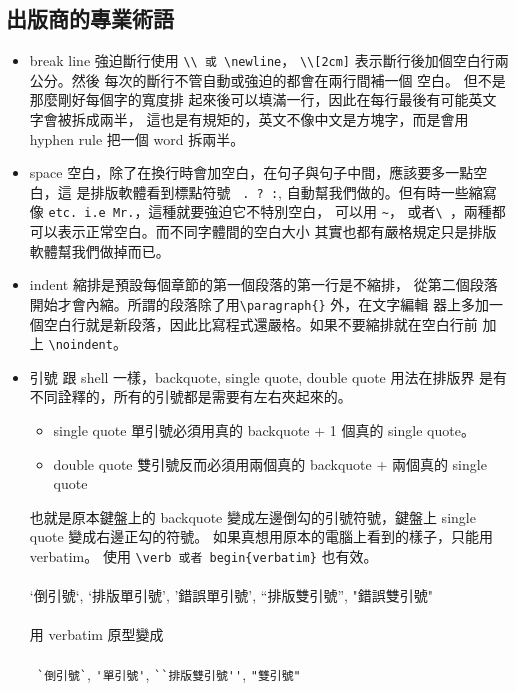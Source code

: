\subsection{出版商的專業術語}
\begin{itemize}
\item break line 強迫斷行使用 \verb=\\ 或 \newline=， \verb=\\[2cm]=
表示斷行後加個空白行兩公分。然後 每次的斷行不管自動或強迫的都會在兩行間補一個
空白。 但不是那麼剛好每個字的寬度排
起來後可以填滿一行，因此在每行最後有可能英文字會被拆成兩半，
這也是有規矩的，英文不像中文是方塊字，而是會用 hyphen rule 把一個 word 拆兩半。
\item space 空白，除了在換行時會加空白，在句子與句子中間，應該要多一點空白，這
是排版軟體看到標點符號 \verb= . ? :=, %
自動幫我們做的。但有時一些縮寫像 \verb=etc. i.e Mr.=，這種就要強迫它不特別空白，
可以用 \verb=~=， 或者\verb=\ =，兩種都可以表示正常空白。而不同字體間的空白大小
其實也都有嚴格規定只是排版軟體幫我們做掉而已。
\item indent 縮排是預設每個章節的第一個段落的第一行是不縮排，
從第二個段落開始才會內縮。所謂的段落除了用\verb=\paragraph{}= 外，在文字編輯
器上多加一個空白行就是新段落，因此比寫程式還嚴格。如果不要縮排就在空白行前
加上 \verb=\noindent=。
\item 引號 跟 shell 一樣，backquote, single quote, double quote 用法在排版界
是有不同詮釋的，所有的引號都是需要有左右夾起來的。
\begin{itemize}
\item single quote 單引號必須用真的 backquote + 1 個真的 single quote。
\item double quote 雙引號反而必須用兩個真的 backquote + 兩個真的 single quote
\end{itemize}
也就是原本鍵盤上的 backquote 變成左邊倒勾的引號符號，鍵盤上 single quote 
變成右邊正勾的符號。 如果真想用原本的電腦上看到的樣子，只能用verbatim。
使用 \verb=\verb 或者 begin{verbatim}= 也有效。\\\\
`倒引號`, `排版單引號', '錯誤單引號', ``排版雙引號'', "錯誤雙引號"\\\\
用 verbatim 原型變成\\\\
\verb= `倒引號`=, \verb='單引號'=, \verb=``排版雙引號''=, \verb="雙引號"=\\\\

\end{itemize}
